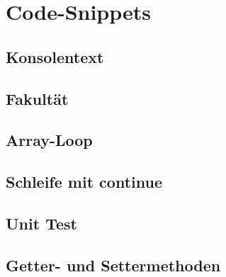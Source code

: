 \section{Code-Snippets}

\subsection{Konsolentext}
    \vspace{-0.3cm}
    
    \vspace{-0.2cm}

\subsection{Fakultät}
    \vspace{-0.3cm}
    
    \vspace{-0.3cm}

\subsection{Array-Loop}{\label{Array-Loop}}
    \vspace{-0.3cm}
    
    \vspace{-0.2cm}

\subsection{Schleife mit continue}
    \vspace{-0.3cm}
    
    \vspace{-0.2cm}

\subsection{Unit Test}{\label{Unit-Test}}
    \vspace{-0.3cm}
    
    \vspace{-0.2cm}

\subsection{Getter- und Settermethoden}{\label{GetSet}}
    \vspace{-0.3cm}
    
    \vspace{-0.2cm}

